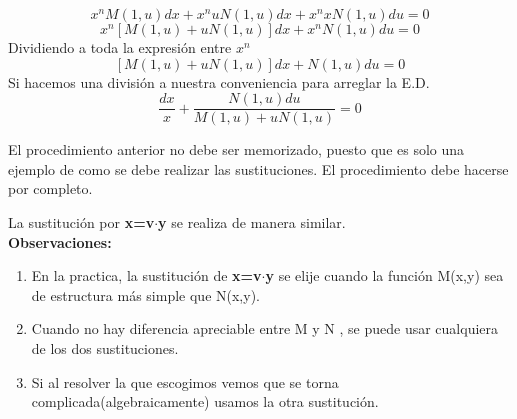 \documentclass[
	11pt, %
	fleqn, %
	a4paper, %
]{LegrandOrangeBook}
\begin{document}
\begin{displaymath}
x^nM(1,u)dx+x^nuN(1,u)dx+x^nxN(1,u)du=0
\end{displaymath}
\begin{displaymath}
x^n\left[M(1,u)+uN(1,u)\right]dx+x^nN(1,u)du=0
\end{displaymath}
Dividiendo a toda la expresión entre $x^n$
\begin{displaymath}
\left[M(1,u)+uN(1,u)\right]dx+N(1,u)du=0
\end{displaymath}
Si hacemos una división a nuestra conveniencia para arreglar la E.D.
\begin{displaymath}
\frac{dx}{x}+\frac{N(1,u)du}{M(1,u)+uN(1,u)}=0
\end{displaymath}
\begin{remark}
El procedimiento anterior no debe ser memorizado, puesto que es solo una ejemplo de como se debe realizar las sustituciones. El procedimiento debe hacerse por completo.
\end{remark}
La sustitución por \textbf{x=v$\cdot$y} se realiza de manera similar.\\
\textbf{Observaciones:}
\begin{enumerate}
\item En la practica, la sustitución de \textbf{x=v$\cdot$y} se elije cuando la función M(x,y) sea de estructura más simple que N(x,y).
\item Cuando no hay diferencia apreciable entre M y N 
, se puede usar cualquiera de los dos sustituciones.
\item Si al resolver la que escogimos vemos que se torna complicada(algebraicamente) usamos la otra sustitución.
\end{enumerate}
\end{document}
